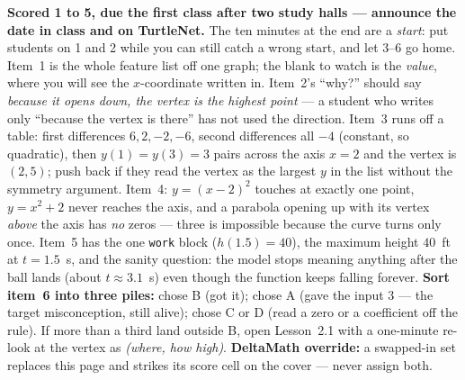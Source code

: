 \documentclass[10pt]{article}
\begin{document}
\begin{teachernote}[Homework]
\textbf{Scored 1 to 5, due the first class after two study halls --- announce the date in class and on
TurtleNet.} The ten minutes at the end are a \emph{start}: put students on 1 and 2 while you can
still catch a wrong start, and let 3--6 go home. Item~1 is the whole feature list off one graph;
the blank to watch is the \emph{value}, where you will see the $x$-coordinate written in. Item~2's
``why?'' should say \emph{because it opens down, the vertex is the highest point} --- a student who
writes only ``because the vertex is there'' has not used the direction. Item~3 runs off a table:
first differences $6,2,-2,-6$, second differences all $-4$ (constant, so quadratic), then
$y(1)=y(3)=3$ pairs across the axis $x=2$ and the vertex is $(2,5)$; push back if they read the
vertex as the largest $y$ in the list without the symmetry argument. Item~4: $y=(x-2)^2$ touches at
exactly one point, $y=x^2+2$ never reaches the axis, and a parabola opening up with its vertex
\emph{above} the axis has \emph{no} zeros --- three is impossible because the curve turns only
once. Item~5 has the one \texttt{work} block ($h(1.5)=40$), the maximum height $40$~ft at
$t=1.5$~s, and the sanity question: the model stops meaning anything after the ball lands (about
$t\approx3.1$~s) even though the function keeps falling forever. \textbf{Sort item~6 into three
piles:} chose B (got it); chose A (gave the input $3$ --- the target misconception, still alive);
chose C or D (read a zero or a coefficient off the rule). If more than a third land outside B, open
Lesson~2.1 with a one-minute re-look at the vertex as \emph{(where, how high)}. \textbf{DeltaMath
override:} a swapped-in set replaces this page and strikes its score cell on the cover --- never
assign both.
\end{teachernote}
\end{document}
